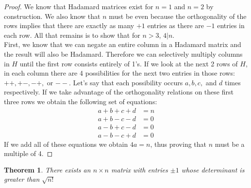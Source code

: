 \documentclass{article}
\newtheorem{theorem}{Theorem}[section]
\theoremstyle{definition}
\begin{document}
\begin{proof}
We know that Hadamard matrices exist for $n=1$ and $n=2$ by construction. We also know that $n$ must be even because the orthogonality of the rows implies that there are exactly as many $+1$ entries as there are $-1$ entries in each row. All that remains is to show that for $n > 3$, $4|n$.\\

First, we know that we can negate an entire column in a Hadamard matrix and the result will also be Hadamard. Therefore we can selectively multiply columns in $H$ until the first row consists entirely of 1's. If we look at the next 2 rows of $H$, in each column there are 4 possibilities for the next two entries in those rows: $++, +-, -+,$ or $--$. Let's say that each possibility occurs $a, b, c,$ and $d$ times respectively. If we take advantage of the orthogonality relations on these first three rows we obtain the following set of equations:
\begin{align*}
  a + b + c + d &= n\\
  a + b - c - d &= 0\\
  a - b + c - d &= 0\\
  a - b - c + d &= 0
\end{align*}
If we add all of these equations we obtain $4a = n$, thus proving that $n$ must be a multiple of 4.
\end{proof}

\begin{theorem}
There exists an $n \times n$ matrix with entries $\pm 1$ whose determinant is greater than $\sqrt{n!}$
\end{theorem}
\end{document}
